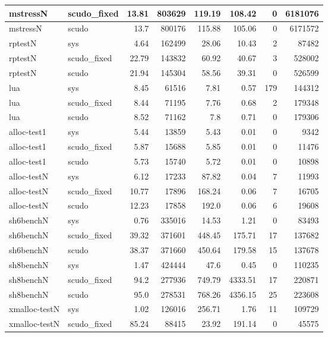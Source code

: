 \documentclass[a4paper,11pt,oneside]{report}
\begin{document}
\begin{longtable}[h]{l l r r r r r r}
  \midrule
  mstressN & scudo\_fixed & 13.81 & 803629 & 119.19 & 108.42 & 0 & 6181076 \\
  \midrule
  mstressN & scudo & 13.7 & 800176 & 115.88 & 105.06 & 0 & 6171572 \\
  \midrule
  rptestN & sys & 4.64 & 162499 & 28.06 & 10.43 & 2 & 87482 \\
  \midrule
  rptestN & scudo\_fixed & 22.79 & 143832 & 60.92 & 40.67 & 3 & 528002 \\
  \midrule
  rptestN & scudo & 21.94 & 145304 & 58.56 & 39.31 & 0 & 526599 \\
  \midrule
  lua & sys & 8.45 & 61516 & 7.81 & 0.57 & 179 & 144312 \\
  \midrule
  lua & scudo\_fixed & 8.44 & 71195 & 7.76 & 0.68 & 2 & 179348 \\
  \midrule
  lua & scudo & 8.52 & 71162 & 7.8 & 0.71 & 0 & 179306 \\
  \midrule
  alloc-test1 & sys & 5.44 & 13859 & 5.43 & 0.01 & 0 & 9342 \\
  \midrule
  alloc-test1 & scudo\_fixed & 5.87 & 15688 & 5.85 & 0.01 & 0 & 11476 \\
  \midrule
  alloc-test1 & scudo & 5.73 & 15740 & 5.72 & 0.01 & 0 & 10898 \\
  \midrule
  alloc-testN & sys & 6.12 & 17233 & 87.82 & 0.04 & 7 & 11993 \\
  \midrule
  alloc-testN & scudo\_fixed & 10.77 & 17896 & 168.24 & 0.06 & 7 & 16705 \\
  \midrule
  alloc-testN & scudo & 12.23 & 17858 & 192.0 & 0.06 & 6 & 19608 \\
  \midrule
  sh6benchN & sys & 0.76 & 335016 & 14.53 & 1.21 & 0 & 83493 \\
  \midrule
  sh6benchN & scudo\_fixed & 39.32 & 371601 & 448.45 & 175.71 & 17 & 137682 \\
  \midrule
  sh6benchN & scudo & 38.37 & 371660 & 450.64 & 179.58 & 15 & 137678 \\
  \midrule
  sh8benchN & sys & 1.47 & 424444 & 47.6 & 0.45 & 0 & 110235 \\
  \midrule
  sh8benchN & scudo\_fixed & 94.2 & 277936 & 749.79 & 4333.51 & 17 & 220871 \\
  \midrule
  sh8benchN & scudo & 95.0 & 278531 & 768.26 & 4356.15 & 25 & 223608 \\
  \midrule
  xmalloc-testN & sys & 1.02 & 126016 & 256.71 & 1.76 & 11 & 109729 \\
  \midrule
  xmalloc-testN & scudo\_fixed & 85.24 & 88415 & 23.92 & 191.14 & 0 & 45575 \\

\end{longtable}
\end{document}
